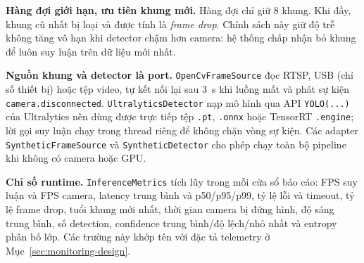 \textbf{Hàng đợi giới hạn, ưu tiên khung mới.} Hàng đợi chỉ giữ 8 khung. Khi
đầy, khung cũ nhất bị loại và được tính là \emph{frame drop}. Chính sách này giữ
độ trễ không tăng vô hạn khi detector chậm hơn camera: hệ thống chấp nhận bỏ
khung để luôn suy luận trên dữ liệu mới nhất.

\textbf{Nguồn khung và detector là port.} \texttt{OpenCvFrameSource} đọc RTSP,
USB (chỉ số thiết bị) hoặc tệp video, tự kết nối lại sau 3~s khi luồng mất và
phát sự kiện \texttt{camera.disconnected}. \texttt{UltralyticsDetector} nạp mô
hình qua API \texttt{YOLO(...)} của Ultralytics nên dùng được trực tiếp tệp
\texttt{.pt}, \texttt{.onnx} hoặc TensorRT \texttt{.engine}; lời gọi suy luận
chạy trong thread riêng để không chặn vòng sự kiện. Các adapter
\texttt{SyntheticFrameSource} và \texttt{SyntheticDetector} cho phép chạy toàn bộ
pipeline khi không có camera hoặc GPU.

\textbf{Chỉ số runtime.} \texttt{InferenceMetrics} tích lũy trong mỗi cửa sổ báo
cáo: FPS suy luận và FPS camera, latency trung bình và p50/p95/p99, tỷ lệ lỗi và
timeout, tỷ lệ frame drop, tuổi khung mới nhất, thời gian camera bị đứng hình,
độ sáng trung bình, số detection, confidence trung bình/độ lệch/nhỏ nhất và
entropy phân bố lớp. Các trường này khớp tên với đặc tả telemetry ở
Mục~\ref{sec:monitoring-design}.
